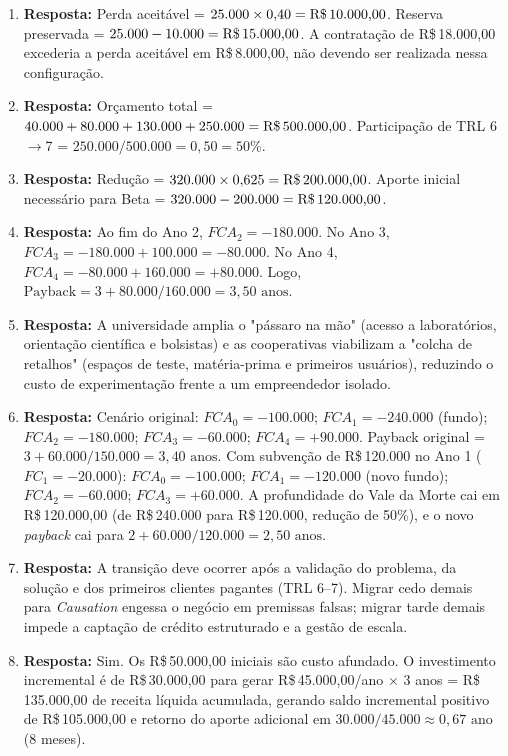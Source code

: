 \begin{boxGabarito}
\begin{enumerate}[leftmargin=1.5em, itemsep=4pt]
    \item \textbf{Resposta:} Perda aceitável = $25.000 \times 0{,}40 = \text{R\$\,10.000,00}$. Reserva preservada = $25.000 - 10.000 = \text{R\$\,15.000,00}$. A contratação de R\$\,18.000,00 excederia a perda aceitável em R\$\,8.000,00, não devendo ser realizada nessa configuração.
    \item \textbf{Resposta:} Orçamento total = $40.000 + 80.000 + 130.000 + 250.000 = \text{R\$\,500.000,00}$. Participação de TRL 6$\to$7 = $250.000 / 500.000 = 0{,}50 = 50\%$.
    \item \textbf{Resposta:} Redução = $320.000 \times 0{,}625 = \text{R\$\,200.000,00}$. Aporte inicial necessário para Beta = $320.000 - 200.000 = \text{R\$\,120.000,00}$.
    \item \textbf{Resposta:} Ao fim do Ano 2, $FCA_2 = -180.000$. No Ano 3, $FCA_3 = -180.000 + 100.000 = -80.000$. No Ano 4, $FCA_4 = -80.000 + 160.000 = +80.000$. Logo, $\text{Payback} = 3 + 80.000 / 160.000 = 3{,}50\text{ anos}$.
    \item \textbf{Resposta:} A universidade amplia o "pássaro na mão" (acesso a laboratórios, orientação científica e bolsistas) e as cooperativas viabilizam a "colcha de retalhos" (espaços de teste, matéria-prima e primeiros usuários), reduzindo o custo de experimentação frente a um empreendedor isolado.
    \item \textbf{Resposta:} Cenário original: $FCA_0 = -100.000$; $FCA_1 = -240.000$ (fundo); $FCA_2 = -180.000$; $FCA_3 = -60.000$; $FCA_4 = +90.000$. Payback original = $3 + 60.000 / 150.000 = 3{,}40\text{ anos}$. Com subvenção de R\$\,120.000 no Ano 1 ($FC_1 = -20.000$): $FCA_0 = -100.000$; $FCA_1 = -120.000$ (novo fundo); $FCA_2 = -60.000$; $FCA_3 = +60.000$. A profundidade do Vale da Morte cai em R\$\,120.000,00 (de R\$\,240.000 para R\$\,120.000, redução de 50\%), e o novo \textit{payback} cai para $2 + 60.000 / 120.000 = 2{,}50\text{ anos}$.
    \item \textbf{Resposta:} A transição deve ocorrer após a validação do problema, da solução e dos primeiros clientes pagantes (TRL 6–7). Migrar cedo demais para \textit{Causation} engessa o negócio em premissas falsas; migrar tarde demais impede a captação de crédito estruturado e a gestão de escala.
    \item \textbf{Resposta:} Sim. Os R\$\,50.000,00 iniciais são custo afundado. O investimento incremental é de R\$\,30.000,00 para gerar R\$\,45.000,00/ano $\times$ 3 anos = R\$\,135.000,00 de receita líquida acumulada, gerando saldo incremental positivo de R\$\,105.000,00 e retorno do aporte adicional em $30.000 / 45.000 \approx 0{,}67\text{ ano}$ (8 meses).

\end{enumerate}
\end{boxGabarito}

